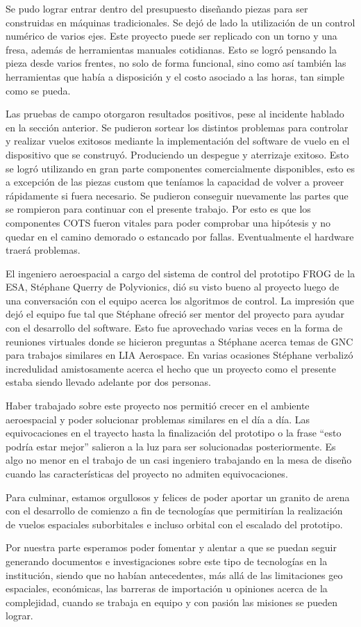 Se pudo lograr entrar dentro del presupuesto diseñando piezas para ser construidas en máquinas tradicionales. Se dejó de lado la utilización de un control numérico de varios ejes. Este proyecto puede ser replicado con un torno y una fresa, además de herramientas manuales cotidianas. Esto se logró pensando la pieza desde varios frentes, no solo de forma funcional, sino como así también las herramientas que había a disposición y el costo asociado a las horas, tan simple como se pueda.

Las pruebas de campo otorgaron resultados positivos, pese al incidente hablado en la sección anterior. Se pudieron sortear los distintos problemas para controlar y realizar vuelos exitosos mediante la implementación del software de vuelo en el dispositivo que se construyó. Produciendo un despegue y aterrizaje exitoso. Esto se logró utilizando en gran parte componentes comercialmente disponibles, esto es a excepción de las piezas custom que teníamos la capacidad de volver a proveer rápidamente si fuera necesario. Se pudieron conseguir nuevamente las partes
que se rompieron para continuar con el presente trabajo. Por esto es que los componentes COTS fueron vitales para poder comprobar una hipótesis y no quedar en el camino demorado o estancado por fallas. Eventualmente el hardware traerá problemas.

El ingeniero aeroespacial a cargo del sistema de control del prototipo FROG de la ESA, Stéphane Querry de Polyvionics, dió su visto bueno al proyecto luego de una conversación con el equipo acerca los algoritmos de control. La impresión que dejó el equipo fue tal que Stéphane ofreció ser mentor del proyecto para ayudar con el desarrollo del software. Esto fue aprovechado varias veces en la forma de reuniones virtuales donde se hicieron preguntas a Stéphane acerca temas de GNC para trabajos similares en LIA Aerospace. En varias ocasiones Stéphane verbalizó incredulidad amistosamente acerca el hecho que un proyecto como el presente estaba siendo llevado adelante por dos personas.

\medskip

Haber trabajado sobre este proyecto nos permitió crecer en el ambiente aeroespacial y poder solucionar problemas similares en el día a día. Las equivocaciones en el trayecto hasta la finalización del prototipo o la frase “esto podría estar mejor” salieron a la luz para ser solucionadas posteriormente. Es algo no menor en el trabajo de un casi ingeniero trabajando en la mesa de diseño cuando las características del proyecto no admiten equivocaciones.

Para culminar, estamos orgullosos y felices de poder aportar un granito de arena con el desarrollo de comienzo a fin de tecnologías que permitirían la realización de vuelos espaciales suborbitales e incluso orbital con el escalado del prototipo.

Por nuestra parte esperamos poder fomentar y alentar a que se puedan seguir generando documentos e investigaciones sobre este tipo de tecnologías en la institución, siendo que no habían antecedentes, más allá de las limitaciones geo espaciales, económicas, las barreras de importación u opiniones acerca de la complejidad, cuando se trabaja en equipo y con pasión las misiones se pueden lograr.
